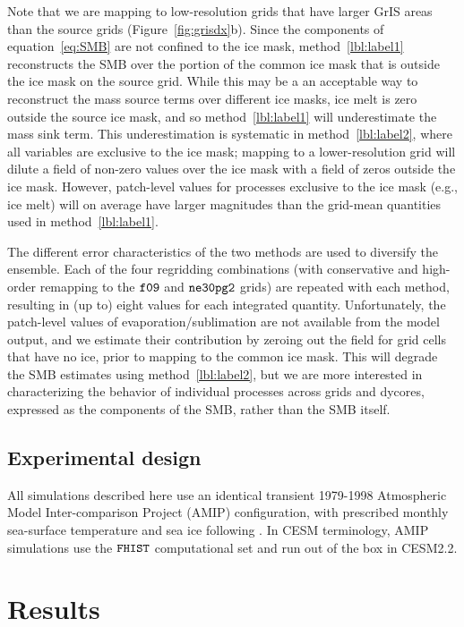 \documentclass[draft]{agujournal2019}
\begin{document}
Note that we are mapping to low-resolution grids that have larger GrIS areas than the source grids (Figure~\ref{fig:grisdx}b). Since the components of equation~\ref{eq:SMB} are not confined to the ice mask, method~\ref{lbl:label1} reconstructs the SMB over the portion of the common ice mask that is outside the ice mask on the source grid. While this may be a an acceptable way to reconstruct the mass source terms over different ice masks, ice melt is zero outside the source ice mask, and so method~\ref{lbl:label1} will underestimate the mass sink term. This underestimation is systematic in method~\ref{lbl:label2}, where all variables are exclusive to the ice mask; mapping to a lower-resolution grid will dilute a field of non-zero values over the ice mask with a field of zeros outside the ice mask. However, patch-level values for processes exclusive to the ice mask (e.g., ice melt) will on average have larger magnitudes than the grid-mean quantities used in method~\ref{lbl:label1}.

The different error characteristics of the two methods are used to diversify the ensemble. Each of the four regridding combinations (with conservative and high-order remapping to the $\tt f09$ and $\tt ne30pg2$ grids) are repeated with each method, resulting in (up to) eight values for each integrated quantity. Unfortunately, the patch-level values of evaporation/sublimation are not available from the model output, and we estimate their contribution by zeroing out the field for grid cells that have no ice, prior to mapping to the common ice mask. This will degrade the SMB estimates using method~\ref{lbl:label2}, but we are more interested in characterizing the behavior of individual processes across grids and dycores, expressed as the components of the SMB, rather than the SMB itself.

\subsection{Experimental design}

All simulations described here use an identical transient 1979-1998 Atmospheric Model Inter-comparison Project (AMIP) configuration, with prescribed monthly sea-surface temperature and sea ice following . In CESM terminology, AMIP simulations use the $\tt FHIST$ computational set and run out of the box in CESM2.2.

\section{Results}\label{sec:results}
\end{document}
